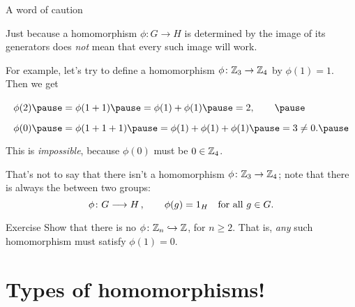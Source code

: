 \documentclass[8pt, handout]{beamer}
\newcommand{\Pause}{\pause}      %
\begin{document}
\begin{frame}{A word of caution} %
  
  Just because a homomorphism $\phi\colon G\to H$ is determined by the
  image of its generators does \emph{not} mean that every such image
  will work.
  
  \medskip\Pause
  
  For example, let's try to define a homomorphism $\phi\colon
  \mathbb{Z}_3\to\mathbb{Z}_4$ by $\phi(1)=1$. \Pause Then we get \vspace{-2mm}
  \[
  \def\arraystretch{1.75}
  \begin{array}{l}
    \phi(2)\Pause=\phi(1+1)\Pause=\phi(1)+\phi(1)\Pause=2,\qquad\Pause
    \\ \phi(0)\Pause=\phi(1+1+1)\Pause=\phi(1)+\phi(1)+\phi(1)\Pause=3\neq
    0. \Pause
  \end{array}
  \]
  This is \emph{impossible}, because $\phi(0)$ must be $0\in\mathbb{Z}_4$.
  
  \medskip\Pause
  
  That's not to say that there isn't a homomorphism
  $\phi\colon\mathbb{Z}_3\to\mathbb{Z}_4$; note that there is always the
   between two groups:
  \[
  \phi\colon G\longrightarrow H\,,\qquad\phi(g)=1_H\quad\text{for all $g\in G$}.
  \]
  
  \Pause
  
  \begin{exampleblock}{Exercise}
    Show that there is no  $\phi\colon\mathbb{Z}_n\hookrightarrow\mathbb{Z}$, for
    $n\geq 2$. That is, \emph{any} such homomorphism must satisfy
    $\phi(1)=0$.
  \end{exampleblock}

\end{frame}

\section{Types of homomorphisms!}
\end{document}
